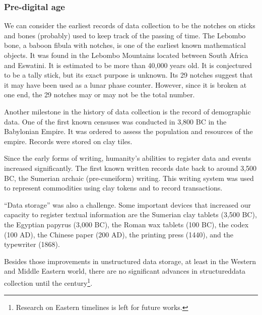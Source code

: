 \subsubsection{Pre-digital age}

We can consider the earliest records of data collection to be the notches on sticks and
bones (probably) used to keep track of the passing of time.  The Lebombo bone, a baboon fibula with
notches, is one of the earliest known mathematical objects.  It was found in the Lebombo
Mountains located between South Africa and Eswatini.
It is estimated to be more
than 40,000 years old. It is conjectured to be a tally stick, but its exact purpose is
unknown. Its 29 notches suggest that it may have been used as a lunar phase counter.
However, since it is broken at one end, the 29 notches may or may not be the total
number.

Another milestone in the history of data collection is the record of
demographic data.  One of the first known censuses was conducted in 3,800 BC in the Babylonian
Empire.  It was ordered to assess the population and resources of
the empire.  Records were stored on clay tiles.

Since the early forms of writing, humanity's abilities to register data and events
increased significantly.  The first known written records date back to around 3,500 BC, the
Sumerian archaic (pre-cuneiform) writing.  This writing system was used to represent
commodities using clay tokens and to record transactions.

``Data storage'' was also a challenge.  Some important devices that increased our capacity
to register textual information are the Sumerian clay tablets (3,500 BC), the Egyptian
papyrus (3,000 BC), the Roman wax tablets (100 BC), the codex
(100 AD), the Chinese paper (200 AD), the printing press (1440), and the typewriter (1868).


Besides those improvements in unstructured data storage, at least in the Western and
Middle Eastern world, there are no significant advances in \gls{structureddata} collection
until the  century\footnote{Research on Eastern timelines is left for future works.}.

